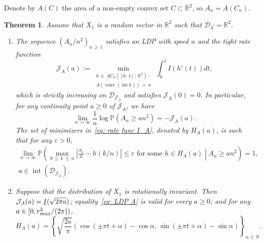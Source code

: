 \documentclass[10pt]{amsart}
\newtheorem{theo}{Theorem}[section]
\theoremstyle{definition}\newtheorem{defi}[theo]{Definition}\newtheorem{rema}[theo]{Remark}\newtheorem{exam}[theo]{Example}\newtheorem{exem}[theo]{Example}\newtheorem{nota}[theo]{Notation}
\DeclareMathOperator{\conv}{conv}
\DeclareMathOperator{\im}{im}
\DeclareMathOperator{\intr}{int}
\newcommand{\ubar}[1]{\underline{#1}}
\newcommand{\Rbb}{\mathbb{R}}
\newcommand{\Pbb}{\mathbb{P}}
\newcommand{\Dcl}{\mathcal{D}}
\newcommand{\Lcl}{\mathcal{L}}
\newcommand{\Jcl}{\mathcal{J}}
\begin{document}
Denote by $A(C)$ the area of a non-empty convex set $C \subset \Rbb^2$, so $A_n=A(C_n)$.

\goodbreak

\begin{theo}\label{thm: LD area}
Assume that $X_1$ is a random vector in $\Rbb^2$ such that $\Dcl_{\Lcl} = \Rbb^2$.
\begin{enumerate}
\item \label{theo2.11.1} The sequence $(A_n/n^2)_{n\,\ge\,1}$ satisfies an LDP with speed $n$ and the tight rate function
\begin{equation}\label{eq: rate func I_A}
\Jcl_A(a):=\min_{\substack{h\,\in\,AC_0\left([0,\,1]\,; \,\Rbb^2\right)\,: \\
A(\conv(\im h))\,=\,a }}\,\int_0^1 I(h'(t)) dt,
\end{equation}
which is strictly increasing on $\Dcl_{\Jcl_A}$ and satisfies $\Jcl_A(0)=0$. In particular, for any continuity point $a \ge 0$ of $\Jcl_A$, we have
\begin{equation}\label{eq: LDP A}
\lim_{n \to \infty} \frac 1n \log \Pbb\left(A_n \ge an^2\right) = -\Jcl_A(a).
\end{equation}
The set of minimizers in~\eqref{eq: rate func I_A}, denoted by $H_A(a)$, is such that for any $\varepsilon > 0$,
\begin{multline}\label{eq: A shape}
\lim_{n \to \infty} \Pbb \left(\max_{0\,\le\,k\,\le\,n} \left| \frac{S_k}{n} - h(k/n) \right| \le \varepsilon \text{ for some } h \in H_A(a) \middle| A_n \ge an^2 \right) = 1, \\
a \in \intr\left(\Dcl_{\Jcl_A}\right).
\end{multline}

\item \label{theo2.11.2}Suppose that the distribution of $X_1$ is rotationally invariant. Then $\Jcl_A(a)\linebreak=\ubar I (\sqrt{2 \pi a })$; equality~\eqref{eq: LDP A} is valid for every $a \ge 0$; and for any $a \in [0, r^2_{max}/\linebreak(2 \pi))$,
\begin{equation}\label{eq: A shape invar}
H_A(a)= \left\{ \sqrt{\frac{2a}{\pi }} \left(\cos (\pm \pi t + \alpha) - \cos \alpha, \, \sin (\pm \pi t + \alpha) - \sin \alpha \right) \right \}_{\alpha\,\in\,\Rbb}.
\end{equation}

\end{enumerate}
\end{theo}
\end{document}

